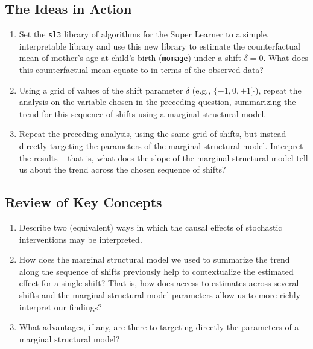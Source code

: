 \documentclass[
  12pt, krantz2,
]{krantz}
\newcommand{\passthrough}[1]{#1}
\theoremstyle{definition}
\theoremstyle{definition}
\theoremstyle{definition}
\newcommand{\1}{\mathbbm{1}}
\begin{document}
\hypertarget{the-ideas-in-action-1}{%
\subsection{The Ideas in Action}\label{the-ideas-in-action-1}}

\begin{enumerate}
\def\labelenumi{\arabic{enumi}.}
\item
  Set the \passthrough{\lstinline!sl3!} library of algorithms for the Super Learner to a simple,
  interpretable library and use this new library to estimate the
  counterfactual mean of mother's age at child's birth (\passthrough{\lstinline!momage!}) under a
  shift \(\delta = 0\). What does this counterfactual mean equate to in terms
  of the observed data?
\item
  Using a grid of values of the shift parameter \(\delta\) (e.g., \(\{-1, 0, +1\}\)), repeat the analysis on the variable chosen in the preceding
  question, summarizing the trend for this sequence of shifts using a marginal
  structural model.
\item
  Repeat the preceding analysis, using the same grid of shifts, but instead
  directly targeting the parameters of the marginal structural model.
  Interpret the results -- that is, what does the slope of the marginal
  structural model tell us about the trend across the chosen sequence of
  shifts?
\end{enumerate}

\hypertarget{review-of-key-concepts-2}{%
\subsection{Review of Key Concepts}\label{review-of-key-concepts-2}}

\begin{enumerate}
\def\labelenumi{\arabic{enumi}.}
\item
  Describe two (equivalent) ways in which the causal effects of stochastic
  interventions may be interpreted.
\item
  How does the marginal structural model we used to summarize the trend along
  the sequence of shifts previously help to contextualize the estimated effect
  for a single shift? That is, how does access to estimates across several
  shifts and the marginal structural model parameters allow us to more richly
  interpret our findings?
\item
  What advantages, if any, are there to targeting directly the parameters of a
  marginal structural model?
\end{enumerate}
\end{document}
